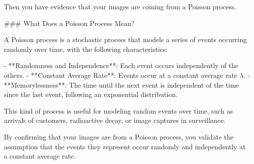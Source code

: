 Then you have evidence that your images are coming from a Poisson process.

### What Does a Poisson Process Mean?

A Poisson process is a stochastic process that models a series of events occurring randomly over time, with the following characteristics:

- **Randomness and Independence**: Each event occurs independently of the others.
- **Constant Average Rate**: Events occur at a constant average rate \( λ \).
- **Memorylessness**: The time until the next event is independent of the time since the last event, following an exponential distribution.

This kind of process is useful for modeling random events over time, such as arrivals of customers, radioactive decay, or image captures in surveillance.

By confirming that your images are from a Poisson process, you validate the assumption that the events they represent occur randomly and independently at a constant average rate.

